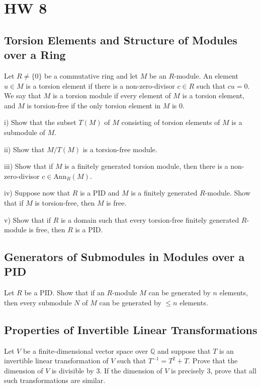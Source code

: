 \documentclass[lang=cn,11pt]{template}
\begin{document}
\chapter{HW 8}

\section{Torsion Elements and Structure of Modules over a Ring}
Let \( R \neq \{0\} \) be a commutative ring and let \( M \) be an \( R \)-module. An element \( u \in M \) is a torsion element if there is a non-zero-divisor \( c \in R \) such that \( cu = 0 \). We say that \( M \) is a torsion module if every element of \( M \) is a torsion element, and \( M \) is torsion-free if the only torsion element in \( M \) is 0.

i) Show that the subset \( T(M) \) of \( M \) consisting of torsion elements of \( M \) is a submodule of \( M \).

ii) Show that \( M/T(M) \) is a torsion-free module.

iii) Show that if \( M \) is a finitely generated torsion module, then there is a non-zero-divisor \( c \in \text{Ann}_R(M) \).

iv) Suppose now that \( R \) is a PID and \( M \) is a finitely generated \( R \)-module. Show that if \( M \) is torsion-free, then \( M \) is free.

v) Show that if \( R \) is a domain such that every torsion-free finitely generated \( R \)-module is free, then \( R \) is a PID.

\section{Generators of Submodules in Modules over a PID}
Let \( R \) be a PID. Show that if an \( R \)-module \( M \) can be generated by \( n \) elements, then every submodule \( N \) of \( M \) can be generated by \( \leq n \) elements.

\section{Properties of Invertible Linear Transformations}
Let \( V \) be a finite-dimensional vector space over \( \mathbb{Q} \) and suppose that \( T \) is an invertible linear transformation of \( V \) such that \( T^{-1} = T^2 + T \). Prove that the dimension of \( V \) is divisible by 3. If the dimension of \( V \) is precisely 3, prove that all such transformations are similar.
\end{document}
